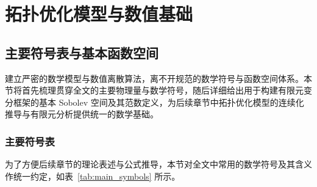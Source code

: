 \chapter{拓扑优化模型与数值基础}
\label{chap:top_models_numerics}


\section{主要符号表与基本函数空间}
\label{sec:notation_spaces}

建立严密的数学模型与数值离散算法，离不开规范的数学符号与函数空间体系。本节将首先梳理贯穿全文的主要物理量与数学符号，随后详细给出用于构建有限元变分框架的基本 Sobolev 空间及其范数定义，为后续章节中拓扑优化模型的连续化推导与有限元分析提供统一的数学基础。


\subsection{主要符号表}
\label{subsec:notation_table}

为了方便后续章节的理论表述与公式推导，本节对全文中常用的数学符号及其含义作统一约定，如表~\ref{tab:main_symbols} 所示。

